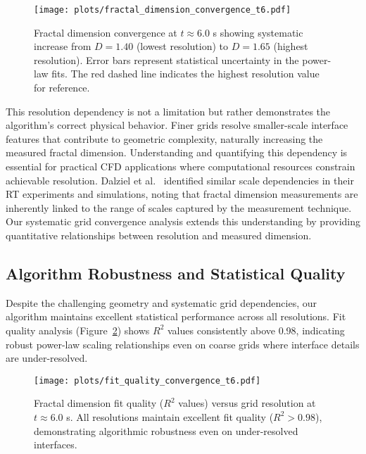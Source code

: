 \documentclass[preprint,12pt]{elsarticle}
\begin{document}
\begin{figure}[htb]
\centering
\texttt{[image: plots/fractal\_dimension\_convergence\_t6.pdf]}
\caption{Fractal dimension convergence at $t \approx 6.0$ s showing systematic increase from $D = 1.40$ (lowest resolution) to $D = 1.65$ (highest resolution). Error bars represent statistical uncertainty in the power-law fits. The red dashed line indicates the highest resolution value for reference.}
\label{fig:fractal_convergence}
\end{figure}

This resolution dependency is not a limitation but rather demonstrates the algorithm's correct physical behavior. Finer grids resolve smaller-scale interface features that contribute to geometric complexity, naturally increasing the measured fractal dimension. Understanding and quantifying this dependency is essential for practical CFD applications where computational resources constrain achievable resolution. Dalziel et al.~\cite{dalziel1999} identified similar scale dependencies in their RT experiments and simulations, noting that fractal dimension measurements are inherently linked to the range of scales captured by the measurement technique. Our systematic grid convergence analysis extends this understanding by providing quantitative relationships between resolution and measured dimension.

\subsection{Algorithm Robustness and Statistical Quality}
\label{subsec:algorithm_robustness}

Despite the challenging geometry and systematic grid dependencies, our algorithm maintains excellent statistical performance across all resolutions. Fit quality analysis (Figure~\ref{fig:fit_quality}) shows $R^2$ values consistently above 0.98, indicating robust power-law scaling relationships even on coarse grids where interface details are under-resolved.

\begin{figure}[htb]
\centering
\texttt{[image: plots/fit\_quality\_convergence\_t6.pdf]}
\caption{Fractal dimension fit quality ($R^2$ values) versus grid resolution at $t \approx 6.0$ s. All resolutions maintain excellent fit quality ($R^2 > 0.98$), demonstrating algorithmic robustness even on under-resolved interfaces.}
\label{fig:fit_quality}
\end{figure}
\end{document}
